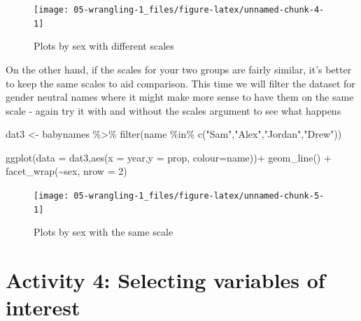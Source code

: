 \documentclass[
  oneside]{book}
\newenvironment{Shaded}{\begin{snugshade}}{\end{snugshade}}
\newcommand{\AttributeTok}[1]{\textcolor[rgb]{0.77,0.63,0.00}{#1}}
\newcommand{\DecValTok}[1]{\textcolor[rgb]{0.00,0.00,0.81}{#1}}
\newcommand{\FunctionTok}[1]{\textcolor[rgb]{0.00,0.00,0.00}{#1}}
\newcommand{\NormalTok}[1]{#1}
\newcommand{\OtherTok}[1]{\textcolor[rgb]{0.56,0.35,0.01}{#1}}
\newcommand{\SpecialCharTok}[1]{\textcolor[rgb]{0.00,0.00,0.00}{#1}}
\newcommand{\StringTok}[1]{\textcolor[rgb]{0.31,0.60,0.02}{#1}}
\begin{document}
\begin{figure}

{\centering \texttt{[image: 05-wrangling-1\_files/figure-latex/unnamed-chunk-4-1]} 

}

\caption{Plots by sex with different scales}\label{fig:unnamed-chunk-4}
\end{figure}

On the other hand, if the scales for your two groups are fairly similar, it's better to keep the same scales to aid comparison. This time we will filter the dataset for gender neutral names where it might make more sense to have them on the same scale - again try it with and without the scales argument to see what happens

\begin{Shaded}
\begin{Highlighting}[]
\NormalTok{dat3 }\OtherTok{\textless{}{-}}\NormalTok{ babynames }\SpecialCharTok{\%\textgreater{}\%} 
  \FunctionTok{filter}\NormalTok{(name }\SpecialCharTok{\%in\%} \FunctionTok{c}\NormalTok{(}\StringTok{"Sam"}\NormalTok{,}\StringTok{"Alex"}\NormalTok{,}\StringTok{"Jordan"}\NormalTok{,}\StringTok{"Drew"}\NormalTok{))}

\FunctionTok{ggplot}\NormalTok{(}\AttributeTok{data =}\NormalTok{ dat3,}\FunctionTok{aes}\NormalTok{(}\AttributeTok{x =}\NormalTok{ year,}\AttributeTok{y =}\NormalTok{ prop, }\AttributeTok{colour=}\NormalTok{name))}\SpecialCharTok{+}
  \FunctionTok{geom\_line}\NormalTok{() }\SpecialCharTok{+}
  \FunctionTok{facet\_wrap}\NormalTok{(}\SpecialCharTok{\textasciitilde{}}\NormalTok{sex, }\AttributeTok{nrow =} \DecValTok{2}\NormalTok{)}
\end{Highlighting}
\end{Shaded}

\begin{figure}

{\centering \texttt{[image: 05-wrangling-1\_files/figure-latex/unnamed-chunk-5-1]} 

}

\caption{Plots by sex with the same scale}\label{fig:unnamed-chunk-5}
\end{figure}

\hypertarget{activity-4-selecting-variables-of-interest}{%
\section{Activity 4: Selecting variables of interest}\label{activity-4-selecting-variables-of-interest}}
\end{document}
